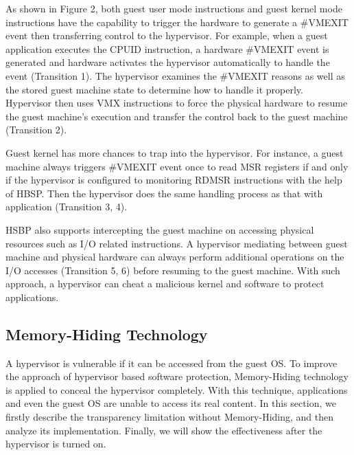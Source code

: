 \documentclass[conference]{IEEEtran}
\begin{document}
As shown in Figure 2, both guest user mode instructions and guest
kernel mode instructions have the capability to trigger the
hardware to generate a \#VMEXIT event then transferring control to
the hypervisor. For example, when a guest application executes the
CPUID instruction, a hardware \#VMEXIT event is generated and
hardware activates the hypervisor automatically to handle the
event (Transition 1). The hypervisor examines the \#VMEXIT reasons
as well as the stored guest machine state to determine how to
handle it properly. Hypervisor then uses VMX instructions to force
the physical hardware to resume the guest machine's execution and
transfer the control back to the guest machine (Transition 2).

Guest kernel has more chances to trap into the hypervisor. For
instance, a guest machine always triggers \#VMEXIT event once to
read MSR registers if and only if the hypervisor is configured to
monitoring RDMSR instructions with the help of HBSP. Then the
hypervisor does the same handling process as that with application
(Transition 3, 4).

HSBP also supports intercepting the guest machine on accessing
physical resources such as I/O related instructions. A hypervisor
mediating between guest machine and physical hardware can always
perform additional operations on the I/O accesses (Transition 5,
6) before resuming to the guest machine. With such approach, a
hypervisor can cheat a malicious kernel and software to protect
applications.

\subsection{Memory-Hiding Technology}
A hypervisor is vulnerable if it can be accessed from the guest
OS. To improve the approach of hypervisor based software
protection, Memory-Hiding technology is applied to conceal the
hypervisor completely. With this technique, applications and even
the guest OS are unable to access its real content. In this
section, we firstly describe the transparency limitation without
Memory-Hiding, and then analyze its implementation. Finally, we
will show the effectiveness after the hypervisor is turned on.
\end{document}
